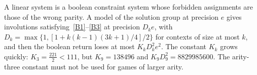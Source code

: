 \begin{remark}\label{rem:parity-forbidden}
A linear system is a boolean constraint system whose forbidden assignments are those of the wrong parity. A model of the
solution group at precision $e$ gives involutions satisfying~\ref{B1}--\ref{B3} at precision $D_ke$, with
$D_k=\max\{1,[1+k(k-1)(3k+1)/4]/2\}$ for contexts of size at most $k$, and then the boolean return loses at most $K_kD_k^2e^2$. The
constant $K_k$ grows quickly: $K_3=\frac{221}2<111$, but $K_9=138496$ and $K_9D_9^2=8829985600$. The arity-three constant must not be used
for games of larger arity.
\end{remark}
